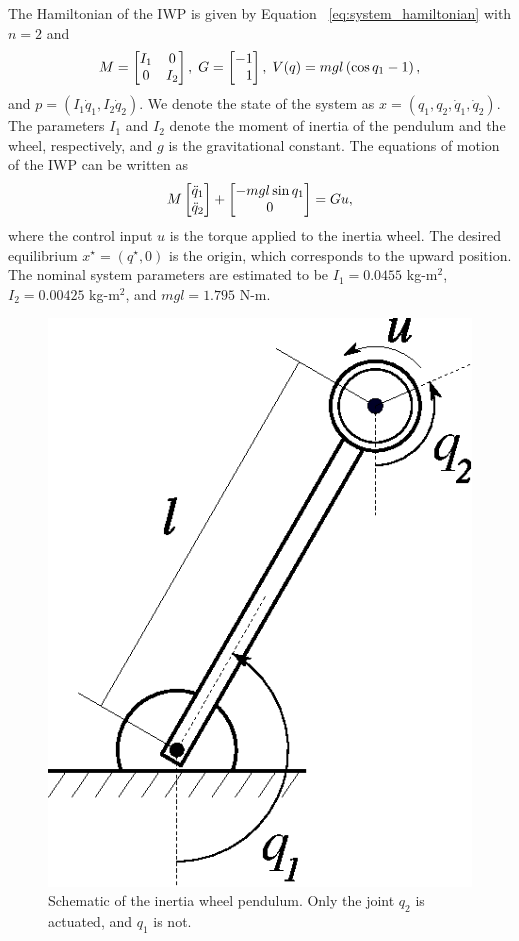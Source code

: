 The Hamiltonian of the IWP is given by Equation ~\eqref{eq:system_hamiltonian}
with $n=2$ and
%
\begin{equation*}
    M = \begin{bmatrix}I_1 & 0 \\ 0 & I_2\end{bmatrix},
    \;
    G = \begin{bmatrix}-1 \\ \phantom{-}1\end{bmatrix},
    \;
    V(q) = mgl \left( \cos q_1 - 1 \right),
\end{equation*}
%
and $p = \left(I_1 \dot{q}_1,I_2 \dot{q}_2\right)$. 
%
We denote the state of the system as $x = (q_1, q_2, \dot{q}_1, \dot{q}_2)$.
%
The parameters \(I_1\) and \(I_2\) denote the moment of inertia of the pendulum
and the wheel, respectively, and \(g\) is the gravitational constant.
%
%
The equations of motion of the IWP can be written as 
%
\begin{equation}
    M \begin{bmatrix}\ddot{q}_1 \\ \ddot{q}_2\end{bmatrix} + \begin{bmatrix}-mgl \sin q_1 \\ 0\end{bmatrix} = Gu, 
    \label{eq:iwp_dynamics}
\end{equation}
%
where the control input \(u\) is the torque applied to the inertia wheel.
%
The desired equilibrium $x^\star = (q^\star, 0)$ is the origin, which
corresponds to the upward position.
%
The nominal system parameters are estimated to be $I_1 = 0.0455$ kg-m$^2$, $I_2
= 0.00425$ kg-m$^2$, and $mgl = 1.795$ N-m. 
%
%

\begin{figure}[t]
    \centering
    \includegraphics[width=0.25\linewidth]{figures/iwp.eps}
    \caption{Schematic of the inertia wheel pendulum. Only the joint $q_2$ is actuated, and $q_1$ is not.}
    \label{fig:iwp}
\end{figure}

